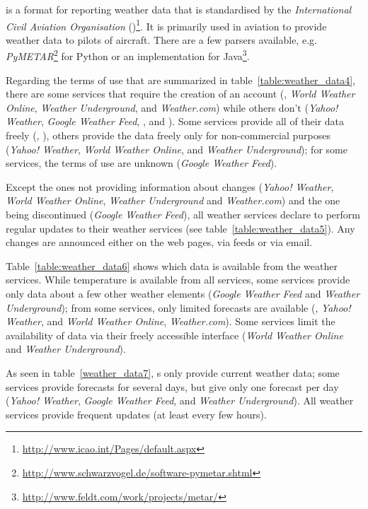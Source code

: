  is a format for reporting weather data that is standardised by the \emph{International Civil Aviation Organisation} ()\footnote{\href{http://www.icao.int/Pages/default.aspx}{http://www.icao.int/Pages/default.aspx}}. It is primarily used in aviation to provide weather data to pilots of aircraft. There are a few parsers available, e.g. \emph{PyMETAR}\footnote{\href{http://www.schwarzvogel.de/software-pymetar.shtml}{http://www.schwarzvogel.de/software-pymetar.shtml}} for Python or an implementation for Java\footnote{\href{http://www.feldt.com/work/projects/metar/}{http://www.feldt.com/work/projects/metar/}}.

Regarding the terms of use that are summarized in table~\ref{table:weather_data4}, there are some services that require the creation of an account (, \emph{World Weather Online}, \emph{Weather Underground}, and \emph{Weather.com}) while others don't (\emph{Yahoo! Weather}, \emph{Google Weather Feed}, \yrno, and ). Some services provide all of their data freely (, \yrno), others provide the data freely only for non-commercial purposes (\emph{Yahoo! Weather}, \emph{World Weather Online}, and \emph{Weather Underground}); for some services, the terms of use are unknown (\emph{Google Weather Feed}).

Except the ones not providing information about changes (\emph{Yahoo! Weather}, \emph{World Weather Online}, \emph{Weather Underground} and \emph{Weather.com}) and the one being discontinued (\emph{Google Weather Feed}), all weather services declare to perform regular updates to their weather services (see table~\ref{table:weather_data5}). Any changes are announced either on the web pages, via  feeds or via email.

Table~\ref{table:weather_data6} shows which data is available from the weather services. While temperature is available from all services, some services provide only data about a few other weather elements (\emph{Google Weather Feed} and \emph{Weather Underground}); from some services, only limited forecasts are available (, \emph{Yahoo! Weather}, and \emph{World Weather Online}, \emph{Weather.com}). Some services limit the availability of data via their freely accessible interface (\emph{World Weather Online} and \emph{Weather Underground}).

As seen in table~\ref{weather_data7}, s only provide current weather data; some services provide forecasts for several days, but give only one forecast per day (\emph{Yahoo! Weather}, \emph{Google Weather Feed}, and \emph{Weather Underground}). All weather services provide frequent updates (at least every few hours).


